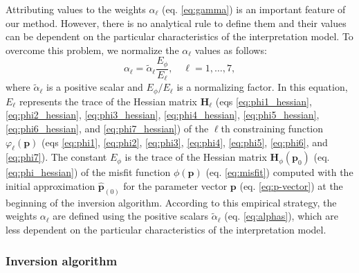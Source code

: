 Attributing values to the weights $ \alpha_{\ell} $ (eq. \ref{eq:gamma}) is an important feature of our method. 
However, there is no analytical rule to define them and their values can be dependent on the particular 
characteristics of the interpretation model. To overcome this problem, we normalize the $ \alpha_{\ell} $ 
values as follows:
\begin{equation}\label{eq:alphas}
\alpha_{\ell} = \tilde{\alpha}_\ell\frac{E_\phi}{E_\ell}, \quad \ell = 1,\dots, 7,
\end{equation}
where $\tilde{\alpha}_\ell$ is a positive scalar and $ E_\phi/E_\ell $ is a normalizing factor. 
In this equation, $ E_\ell $ represents the 
trace of the Hessian matrix $\mathbf{H}_{\ell}$ 
(eqs \ref{eq:phi1_hessian}, \ref{eq:phi2_hessian}, \ref{eq:phi3_hessian}, \ref{eq:phi4_hessian}, \ref{eq:phi5_hessian}, 
\ref{eq:phi6_hessian}, and \ref{eq:phi7_hessian})
of the $\ell$th constraining function $\varphi_{\ell}(\mathbf{p})$ 
(eqs \ref{eq:phi1}, \ref{eq:phi2}, \ref{eq:phi3}, \ref{eq:phi4}, \ref{eq:phi5}, \ref{eq:phi6}, and \ref{eq:phi7}). 
The constant $E_\phi$ is the trace of the Hessian matrix $\mathbf{H}_{\phi}(\mathbf{p}_{0})$ (eq. \ref{eq:phi_hessian}) of 
the misfit function $\phi(\mathbf{p})$ (eq. \ref{eq:misfit}) computed with the initial approximation $\hat{\mathbf{p}}_{(0)}$ 
for the parameter vector $ \mathbf{p} $ (eq. \ref{eq:p-vector}) at the beginning of the inversion algorithm. 
According to this empirical strategy, the weights $ \alpha_{\ell} $ 
are defined using the positive scalars $\tilde{\alpha}_\ell$ (eq. \ref{eq:alphas}), which are less dependent on the 
particular characteristics of the interpretation model.

\subsubsection{Inversion algorithm}

